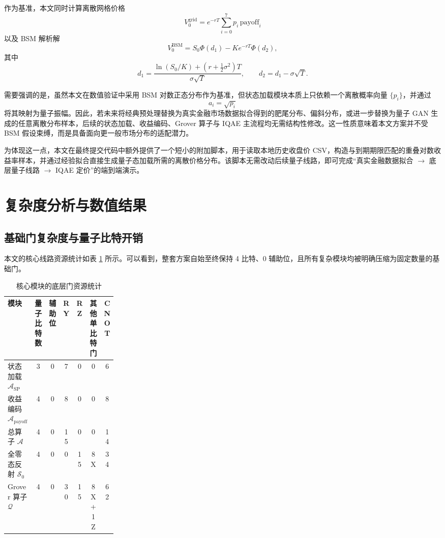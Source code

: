 \documentclass[12pt,a4paper]{ctexart}
\begin{document}
作为基准，本文同时计算离散网格价格
\begin{equation}
V_0^{\mathrm{grid}}=e^{-rT}\sum_{i=0}^{7}p_i\,\mathrm{payoff}_i
\end{equation}
以及 BSM 解析解
\begin{equation}
V_0^{\mathrm{BSM}}=S_0\Phi(d_1)-Ke^{-rT}\Phi(d_2),
\end{equation}
其中
\begin{equation}
d_1=\frac{\ln(S_0/K)+(r+\frac{1}{2}\sigma^2)T}{\sigma\sqrt{T}},
\qquad
d_2=d_1-\sigma\sqrt{T}.
\end{equation}

需要强调的是，虽然本文在数值验证中采用 BSM 对数正态分布作为基准，但状态加载模块本质上只依赖一个离散概率向量 $\{p_i\}$，并通过
\begin{equation}
a_i=\sqrt{p_i}
\end{equation}
将其映射为量子振幅。因此，若未来将经典预处理替换为真实金融市场数据拟合得到的肥尾分布、偏斜分布，或进一步替换为量子 GAN 生成的任意离散分布样本，后续的状态加载、收益编码、Grover 算子与 IQAE 主流程均无需结构性修改。这一性质意味着本文方案并不受 BSM 假设束缚，而是具备面向更一般市场分布的适配潜力。

为体现这一点，本文在最终提交代码中额外提供了一个短小的附加脚本，用于读取本地历史收盘价 CSV，构造与到期期限匹配的重叠对数收益率样本，并通过经验拟合直接生成量子态加载所需的离散价格分布。该脚本无需改动后续量子线路，即可完成“真实金融数据拟合 $\rightarrow$ 底层量子线路 $\rightarrow$ IQAE 定价”的端到端演示。

\section{复杂度分析与数值结果}
\subsection{基础门复杂度与量子比特开销}
本文的核心线路资源统计如表 \ref{tab:resources} 所示。可以看到，整套方案自始至终保持 4 比特、0 辅助位，且所有复杂模块均被明确压缩为固定数量的基础门。

\begin{table}[H]
\centering
\small
\caption{核心模块的底层门资源统计}
\label{tab:resources}
\begin{tabular}{>{\raggedright\arraybackslash}p{0.25\linewidth}cccccc}
\toprule
模块 & 量子比特数 & 辅助位 & RY & RZ & 其他单比特门 & CNOT \\
\midrule
状态加载 $\mathcal{A}_{\mathrm{SP}}$ & 3 & 0 & 7 & 0 & 0 & 6 \\
收益编码 $\mathcal{A}_{\mathrm{payoff}}$ & 4 & 0 & 8 & 0 & 0 & 8 \\
总算子 $\mathcal{A}$ & 4 & 0 & 15 & 0 & 0 & 14 \\
全零态反射 $\mathcal{S}_0$ & 4 & 0 & 0 & 15 & 8X & 34 \\
Grover 算子 $\mathcal{Q}$ & 4 & 0 & 30 & 15 & 8X+1Z & 62 \\
\bottomrule
\end{tabular}
\end{table}
\end{document}
